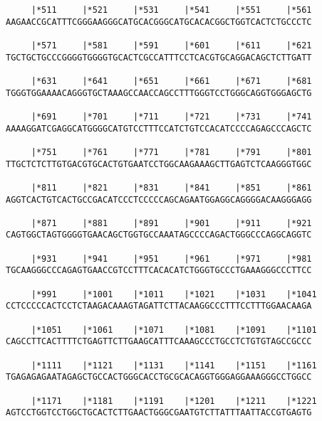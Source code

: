 \documentclass{article}
\begin{document}
\begin{Verbatim}
     |*511     |*521     |*531     |*541     |*551     |*561
AAGAACCGCATTTCGGGAAGGGCATGCACGGGCATGCACACGGCTGGTCACTCTGCCCTC
                                                            
     |*571     |*581     |*591     |*601     |*611     |*621
TGCTGCTGCCCGGGGTGGGGTGCACTCGCCATTTCCTCACGTGCAGGACAGCTCTTGATT
                                                            
     |*631     |*641     |*651     |*661     |*671     |*681
TGGGTGGAAAACAGGGTGCTAAAGCCAACCAGCCTTTGGGTCCTGGGCAGGTGGGAGCTG
                                                            
     |*691     |*701     |*711     |*721     |*731     |*741
AAAAGGATCGAGGCATGGGGCATGTCCTTTCCATCTGTCCACATCCCCAGAGCCCAGCTC
                                                            
     |*751     |*761     |*771     |*781     |*791     |*801
TTGCTCTCTTGTGACGTGCACTGTGAATCCTGGCAAGAAAGCTTGAGTCTCAAGGGTGGC
                                                            
     |*811     |*821     |*831     |*841     |*851     |*861
AGGTCACTGTCACTGCCGACATCCCTCCCCCAGCAGAATGGAGGCAGGGGACAAGGGAGG
                                                            
     |*871     |*881     |*891     |*901     |*911     |*921
CAGTGGCTAGTGGGGTGAACAGCTGGTGCCAAATAGCCCCAGACTGGGCCCAGGCAGGTC
                                                            
     |*931     |*941     |*951     |*961     |*971     |*981
TGCAAGGGCCCAGAGTGAACCGTCCTTTCACACATCTGGGTGCCCTGAAAGGGCCCTTCC
                                                            
     |*991     |*1001    |*1011    |*1021    |*1031    |*1041
CCTCCCCCACTCCTCTAAGACAAAGTAGATTCTTACAAGGCCCTTTCCTTTGGAACAAGA
                                                            
     |*1051    |*1061    |*1071    |*1081    |*1091    |*1101
CAGCCTTCACTTTTCTGAGTTCTTGAAGCATTTCAAAGCCCTGCCTCTGTGTAGCCGCCC
                                                            
     |*1111    |*1121    |*1131    |*1141    |*1151    |*1161
TGAGAGAGAATAGAGCTGCCACTGGGCACCTGCGCACAGGTGGGAGGAAAGGGCCTGGCC
                                                            
     |*1171    |*1181    |*1191    |*1201    |*1211    |*1221
AGTCCTGGTCCTGGCTGCACTCTTGAACTGGGCGAATGTCTTATTTAATTACCGTGAGTG
                                                            

\end{Verbatim}
\end{document}
